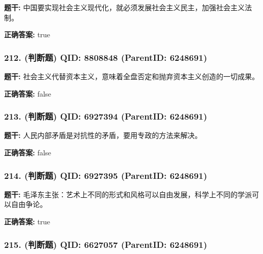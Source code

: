 \documentclass[12pt,UTF8]{ctexart}
\begin{document}
\textbf{题干:}
中国要实现社会主义现代化，就必须发展社会主义民主，加强社会主义法制。



\textbf{正确答案:}
true

\vspace{0.3em}\hrulefill\vspace{0.7em}

\subsubsection*{212. (判断题) \small QID: 8808848 (ParentID: 6248691)}

\textbf{题干:}
社会主义代替资本主义，意味着全盘否定和抛弃资本主义创造的一切成果。



\textbf{正确答案:}
false

\vspace{0.3em}\hrulefill\vspace{0.7em}

\subsubsection*{213. (判断题) \small QID: 6927394 (ParentID: 6248691)}

\textbf{题干:}
人民内部矛盾是对抗性的矛盾，要用专政的方法来解决。



\textbf{正确答案:}
false

\vspace{0.3em}\hrulefill\vspace{0.7em}

\subsubsection*{214. (判断题) \small QID: 6927395 (ParentID: 6248691)}

\textbf{题干:}
毛泽东主张：艺术上不同的形式和风格可以自由发展，科学上不同的学派可以自由争论。



\textbf{正确答案:}
true

\vspace{0.3em}\hrulefill\vspace{0.7em}

\subsubsection*{215. (判断题) \small QID: 6627057 (ParentID: 6248691)}
\end{document}
